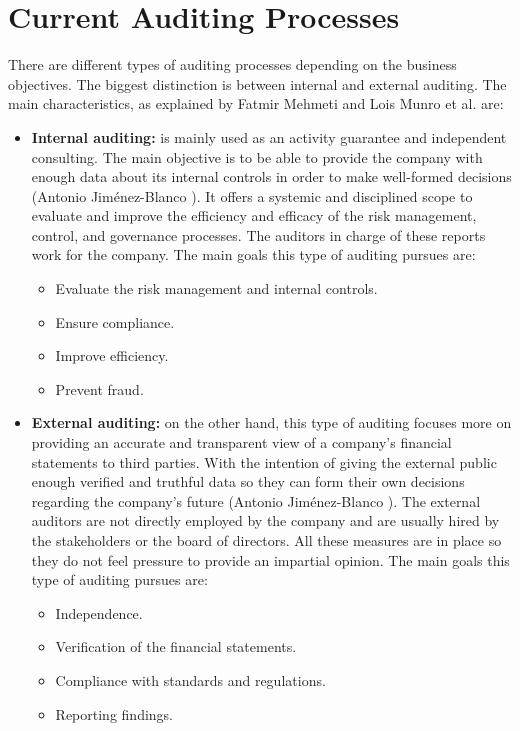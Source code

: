 \section{Current Auditing Processes}
\label{Types of Auditing}

There are different types of auditing processes depending on the business objectives. The biggest distinction is between internal and external auditing. The main characteristics, as explained by Fatmir Mehmeti \cite{ExternalInternalAuditing1} and Lois Munro et al. \cite{ExternalInternalAuditing2} are:
\begin{itemize}
    \item \textbf{Internal auditing:} is mainly used as an activity guarantee and independent consulting. The main objective is to be able to provide the company with enough data about its internal controls in order to make well-formed decisions (Antonio Jiménez-Blanco \cite{claseAuditoríaT3}). It offers a systemic and disciplined scope to evaluate and improve the efficiency and efficacy of the risk management, control, and governance processes. The auditors in charge of these reports work for the company. The main goals this type of auditing pursues are:
    \begin{itemize}
        \item Evaluate the risk management and internal controls.
        \item Ensure compliance.
        \item Improve efficiency.
        \item Prevent fraud.
    \end{itemize}
    \item \textbf{External auditing:} on the other hand, this type of auditing focuses more on providing an accurate and transparent view of a company's financial statements to third parties. With the intention of giving the external public enough verified and truthful data so they can form their own decisions regarding the company's future (Antonio Jiménez-Blanco \cite{claseAuditoríaT3}). The external auditors are not directly employed by the company and are usually hired by the stakeholders or the board of directors. All these measures are in place so they do not feel pressure to provide an impartial opinion. The main goals this type of auditing pursues are:
    \begin{itemize}
        \item Independence.
        \item Verification of the financial statements.
        \item Compliance with standards and regulations.
        \item Reporting findings.
    \end{itemize}
\end{itemize}

